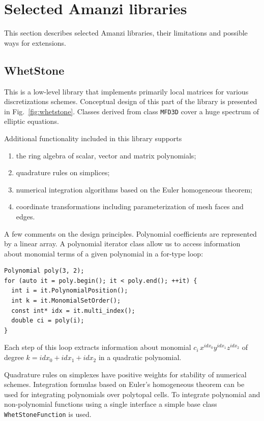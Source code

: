 
\section{Selected Amanzi libraries}

This section describes selected Amanzi libraries, their limitations and possible 
ways for extensions.

\subsection{WhetStone}
This is a low-level library that implements primarily local matrices for 
various discretizations schemes. 
Conceptual design of this part of the library is presented in Fig.~\ref{fig:whetstone}.
Classes derived from class {\tt MFD3D} cover a huge spectrum of elliptic
equations.

Additional functionality included in this library supports
\begin{enumerate}
\item the ring algebra of scalar, vector and matrix polynomials;
\item quadrature rules on simplices;
\item numerical integration algorithms based on the Euler homogeneous theorem;
\item coordinate transformations including parameterization of mesh faces and edges.
\end{enumerate}

A few  comments on the design principles. 
Polynomial coefficients are represented by a linear array. 
A polynomial iterator class allow us to access information about monomial terms of 
a given polynomial in a for-type loop:
\begin{lstlisting}
Polynomial poly(3, 2);
for (auto it = poly.begin(); it < poly.end(); ++it) {
  int i = it.PolynomialPosition();
  int k = it.MonomialSetOrder();
  const int* idx = it.multi_index();
  double ci = poly(i);
}
\end{lstlisting}
Each step of this loop extracts information about monomial $c_i \,x^{idx_0} y^{idx_1} z^{idx_2}$
of degree $k= idx_0 + idx_1 + idx_2$ in a quadratic polynomial.

Quadrature rules on simplexes have positive weights for stability of numerical schemes. 
Integration formulas based on Euler's homogeneous theorem can be used for integrating
polynomials over polytopal cells.
To integrate polynomial and non-polynomial functions using a single interface a simple
base class {\tt WhetStoneFunction} is used.

